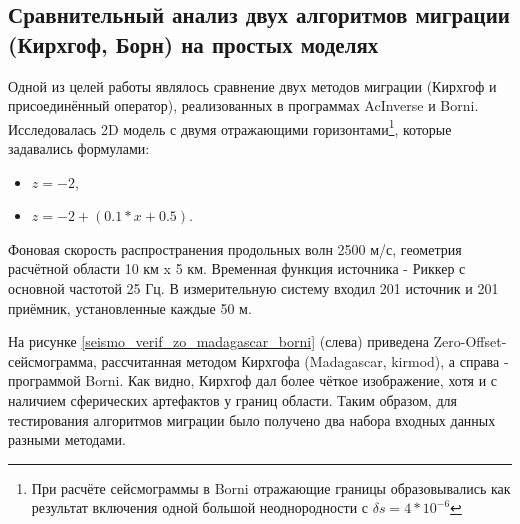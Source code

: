 \documentclass{article}
\begin{document}
\subsection{Сравнительный анализ двух алгоритмов миграции (Кирхгоф, Борн) на простых моделях}

Одной из целей работы являлось сравнение двух методов миграции (Кирхгоф и присоединённый оператор), реализованных в программах AcInverse и Borni.
Исследовалась 2D модель с двумя отражающими горизонтами\footnote{При расчёте сейсмограммы в Borni отражающие границы образовывались как результат включения одной большой неоднородности с $\delta s = 4*10^{-6}$}, которые задавались формулами:
\begin{itemize}
\item $z=-2$,
\item $z=-2 + (0.1 * x + 0.5)$.
\end{itemize}
Фоновая скорость распространения продольных волн 2500 м/с, геометрия расчётной области 10 км x 5 км.
Временная функция источника - Риккер с основной частотой 25 Гц.
В измерительную систему входил 201 источник и 201 приёмник, установленные каждые 50 м.

На рисунке \ref{seismo_verif_zo_madagascar_borni} (слева) приведена Zero-Offset-сейсмограмма, рассчитанная методом Кирхгофа (Madagascar, kirmod), а справа - программой Borni.
Как видно, Кирхгоф дал более чёткое изображение, хотя и с наличием сферических артефактов у границ области.
Таким образом, для тестирования алгоритмов миграции было получено два набора входных данных разными методами.

\noindent
\begin{minipage}{\linewidth}
\label{seismo_verif_zo_madagascar_borni}
\end{minipage}
\end{document}
